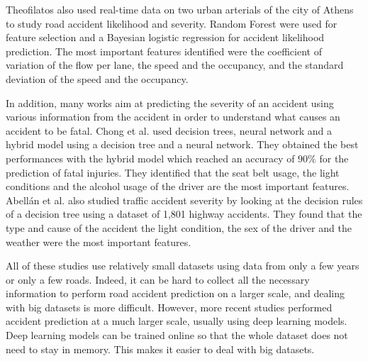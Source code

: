 \documentclass[conference]{IEEEtran}
\begin{document}
Theofilatos\cite{Theofilatos2017} also used
real-time data on two urban arterials of the city of Athens to study road
accident likelihood and severity. Random Forest were used for feature
selection and a Bayesian logistic regression for accident likelihood
prediction. The most important features identified were the coefficient of
variation of the flow per lane, the speed and the occupancy, and the
standard deviation of the speed and the occupancy. 

In addition, many
works aim at predicting the severity of an accident using various
information from the accident in order to understand what causes an
accident to be fatal. Chong et al.\cite{Chong2005} used decision trees,
neural network and a hybrid model using a decision tree and a neural
network. They obtained the best performances with the hybrid model which
reached an accuracy of $90\%$ for the prediction of fatal injuries. They
identified that the seat belt usage, the light conditions and the alcohol
usage of the driver are the most important features. Abellán et al.
\cite{Abellan2013} also studied traffic accident severity by looking at the
decision rules of a decision tree using a dataset of 1,801 highway
accidents. They found that the type and cause of the accident the light
condition, the sex of the driver and the weather were the most important
features.

All of these studies use relatively small datasets using data from only a
few years or only a few roads. Indeed, it can be hard to collect all the
necessary information to perform road accident prediction on a larger
scale, and dealing with big datasets is more difficult. However, more
recent studies \cite{QChen2016, Najjar2017, Yuan2018} performed accident prediction at a much larger scale,
usually using deep learning models. Deep learning models can be trained
online so that the whole dataset does not need to stay in memory. This
makes it easier to deal with big datasets.
\end{document}
